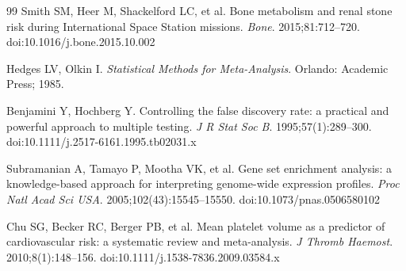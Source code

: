 \documentclass[11pt,a4paper]{article}
\begin{document}
\begin{thebibliography}{99}
Smith SM, Heer M, Shackelford LC, et al. Bone metabolism and renal stone risk during International Space Station missions. \textit{Bone}. 2015;81:712--720. doi:10.1016/j.bone.2015.10.002

Hedges LV, Olkin I. \textit{Statistical Methods for Meta-Analysis}. Orlando: Academic Press; 1985.

Benjamini Y, Hochberg Y. Controlling the false discovery rate: a practical and powerful approach to multiple testing. \textit{J R Stat Soc B}. 1995;57(1):289--300. doi:10.1111/j.2517-6161.1995.tb02031.x

Subramanian A, Tamayo P, Mootha VK, et al. Gene set enrichment analysis: a knowledge-based approach for interpreting genome-wide expression profiles. \textit{Proc Natl Acad Sci USA}. 2005;102(43):15545--15550. doi:10.1073/pnas.0506580102

Chu SG, Becker RC, Berger PB, et al. Mean platelet volume as a predictor of cardiovascular risk: a systematic review and meta-analysis. \textit{J Thromb Haemost}. 2010;8(1):148--156. doi:10.1111/j.1538-7836.2009.03584.x

\end{thebibliography}
\end{document}
